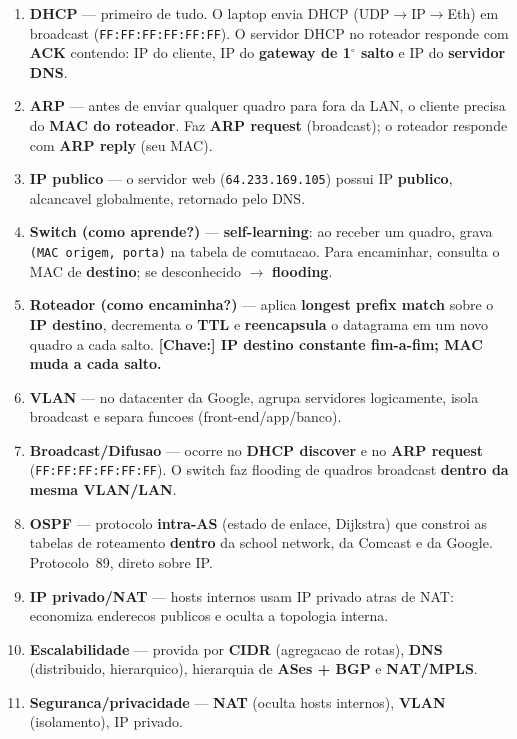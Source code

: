\documentclass[11pt,a4paper]{article}
\begin{document}
\begin{explicacao}
\begin{enumerate}[label=\textbf{\arabic*.}, leftmargin=*, noitemsep]
    \item \textbf{DHCP} --- primeiro de tudo. O laptop envia DHCP (UDP$\to$IP$\to$Eth) em broadcast (\texttt{FF:FF:FF:FF:FF:FF}). O servidor DHCP no roteador responde com \textbf{ACK} contendo: IP do cliente, IP do \textbf{gateway de 1$^{\circ}$ salto} e IP do \textbf{servidor DNS}.
    \item \textbf{ARP} --- antes de enviar qualquer quadro para fora da LAN, o cliente precisa do \textbf{MAC do roteador}. Faz \textbf{ARP request} (broadcast); o roteador responde com \textbf{ARP reply} (seu MAC).
    \item \textbf{IP publico} --- o servidor web (\texttt{64.233.169.105}) possui IP \textbf{publico}, alcancavel globalmente, retornado pelo DNS.
    \item \textbf{Switch (como aprende?)} --- \textbf{self-learning}: ao receber um quadro, grava \texttt{(MAC origem, porta)} na tabela de comutacao. Para encaminhar, consulta o MAC de \textbf{destino}; se desconhecido $\to$ \textbf{flooding}.
    \item \textbf{Roteador (como encaminha?)} --- aplica \textbf{longest prefix match} sobre o \textbf{IP destino}, decrementa o \textbf{TTL} e \textbf{reencapsula} o datagrama em um novo quadro a cada salto. \textbf{[Chave:] IP destino constante fim-a-fim; MAC muda a cada salto.}
    \item \textbf{VLAN} --- no datacenter da Google, agrupa servidores logicamente, isola broadcast e separa funcoes (front-end/app/banco).
    \item \textbf{Broadcast/Difusao} --- ocorre no \textbf{DHCP discover} e no \textbf{ARP request} (\texttt{FF:FF:FF:FF:FF:FF}). O switch faz flooding de quadros broadcast \textbf{dentro da mesma VLAN/LAN}.
    \item \textbf{OSPF} --- protocolo \textbf{intra-AS} (estado de enlace, Dijkstra) que constroi as tabelas de roteamento \textbf{dentro} da school network, da Comcast e da Google. Protocolo~89, direto sobre IP.
    \item \textbf{IP privado/NAT} --- hosts internos usam IP privado atras de NAT: economiza enderecos publicos e oculta a topologia interna.
    \item \textbf{Escalabilidade} --- provida por \textbf{CIDR} (agregacao de rotas), \textbf{DNS} (distribuido, hierarquico), hierarquia de \textbf{ASes + BGP} e \textbf{NAT/MPLS}.
    \item \textbf{Seguranca/privacidade} --- \textbf{NAT} (oculta hosts internos), \textbf{VLAN} (isolamento), IP privado.

\end{enumerate}
\end{explicacao}
\end{document}
